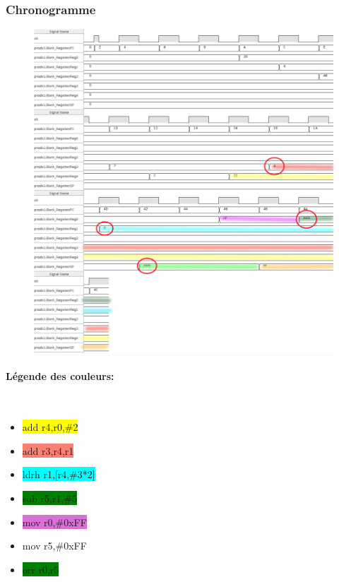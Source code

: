 \documentclass[a4paper]{article} %
\begin{document}
\subsubsection{Chronogramme}
\begin{figure}[H]
    \centering
    \includegraphics[width=.8\textwidth]{src/CHRONO_ET2_V2_COL.png}
    \label{fig:chrono_et2_pic}
\end{figure}

\paragraph{Légende des couleurs:}\mbox{}\\
\begin{itemize}[before=\ttfamily\bfseries]
   \item \colorbox{yellow}{add r4,r0,\#2}
   \item \colorbox{Salmon}{add r3,r4,r1}
   \item \colorbox{Cyan}{ldrh r1,[r4,\#3*2]}
   \item \colorbox{green}{sub r5,r1,\#5}
   \item \colorbox{Orchid}{mov r0,\#0xFF}
   \item \colorbox{Dandelion}{mov r5,\#0xFF}
   \item \colorbox{Green}{orr r0,r5}
\end{itemize}
\end{document}
